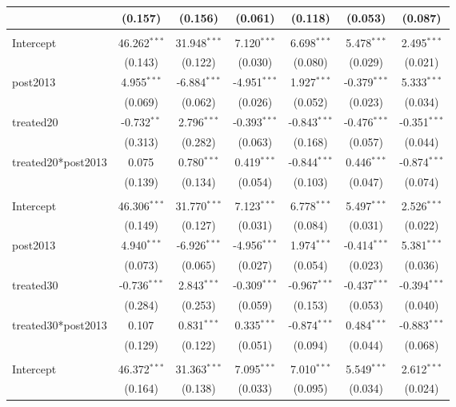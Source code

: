 \documentclass[12pt]{article}
\begin{document}
\begin{table}[!htbp]
\begin{tabular}{@{\extracolsep{5pt}}lcccccc}
  & (0.157) & (0.156) & (0.061) & (0.118) & (0.053) & (0.087) \\
\hline \\[-1.8ex]
 Intercept & 46.262$^{***}$ & 31.948$^{***}$ & 7.120$^{***}$ & 6.698$^{***}$ & 5.478$^{***}$ & 2.495$^{***}$ \\
  & (0.143) & (0.122) & (0.030) & (0.080) & (0.029) & (0.021) \\
 post2013 & 4.955$^{***}$ & -6.884$^{***}$ & -4.951$^{***}$ & 1.927$^{***}$ & -0.379$^{***}$ & 5.333$^{***}$ \\
  & (0.069) & (0.062) & (0.026) & (0.052) & (0.023) & (0.034) \\
 treated20 & -0.732$^{**}$ & 2.796$^{***}$ & -0.393$^{***}$ & -0.843$^{***}$ & -0.476$^{***}$ & -0.351$^{***}$ \\
  & (0.313) & (0.282) & (0.063) & (0.168) & (0.057) & (0.044) \\
 treated20*post2013 & 0.075$^{}$ & 0.780$^{***}$ & 0.419$^{***}$ & -0.844$^{***}$ & 0.446$^{***}$ & -0.874$^{***}$ \\
  & (0.139) & (0.134) & (0.054) & (0.103) & (0.047) & (0.074) \\
\hline \\[-1.8ex]
 Intercept & 46.306$^{***}$ & 31.770$^{***}$ & 7.123$^{***}$ & 6.778$^{***}$ & 5.497$^{***}$ & 2.526$^{***}$ \\
  & (0.149) & (0.127) & (0.031) & (0.084) & (0.031) & (0.022) \\
 post2013 & 4.940$^{***}$ & -6.926$^{***}$ & -4.956$^{***}$ & 1.974$^{***}$ & -0.414$^{***}$ & 5.381$^{***}$ \\
  & (0.073) & (0.065) & (0.027) & (0.054) & (0.023) & (0.036) \\
 treated30 & -0.736$^{***}$ & 2.843$^{***}$ & -0.309$^{***}$ & -0.967$^{***}$ & -0.437$^{***}$ & -0.394$^{***}$ \\
  & (0.284) & (0.253) & (0.059) & (0.153) & (0.053) & (0.040) \\
 treated30*post2013 & 0.107$^{}$ & 0.831$^{***}$ & 0.335$^{***}$ & -0.874$^{***}$ & 0.484$^{***}$ & -0.883$^{***}$ \\
  & (0.129) & (0.122) & (0.051) & (0.094) & (0.044) & (0.068) \\
\hline \\[-1.8ex]
 Intercept & 46.372$^{***}$ & 31.363$^{***}$ & 7.095$^{***}$ & 7.010$^{***}$ & 5.549$^{***}$ & 2.612$^{***}$ \\
  & (0.164) & (0.138) & (0.033) & (0.095) & (0.034) & (0.024) \\

\end{tabular}
\end{table}
\end{document}
